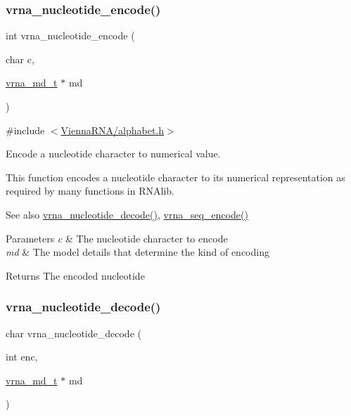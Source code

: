 \subsubsection{\texorpdfstring{vrna\+\_\+nucleotide\+\_\+encode()}{vrna\_nucleotide\_encode()}}
{\footnotesize\ttfamily int vrna\+\_\+nucleotide\+\_\+encode (\begin{DoxyParamCaption}\item[{char}]{c,  }\item[{\hyperlink{group__model__details_ga1f8a10e12a0a1915f2a4eff0b28ea17c}{vrna\+\_\+md\+\_\+t} $\ast$}]{md }\end{DoxyParamCaption})}



{\ttfamily \#include $<$\hyperlink{alphabet_8h}{Vienna\+R\+N\+A/alphabet.\+h}$>$}



Encode a nucleotide character to numerical value. 

This function encodes a nucleotide character to its numerical representation as required by many functions in R\+N\+Alib.

\begin{DoxySeeAlso}{See also}
\hyperlink{group__utils_ga48ef585e697be9c8a08ed68c655e29b6}{vrna\+\_\+nucleotide\+\_\+decode()}, \hyperlink{group__utils_ga636e7d6f888fd639587296a5eddea660}{vrna\+\_\+seq\+\_\+encode()}
\end{DoxySeeAlso}

\begin{DoxyParams}{Parameters}
{\em c} & The nucleotide character to encode \\
\hline
{\em md} & The model details that determine the kind of encoding \\
\hline
\end{DoxyParams}
\begin{DoxyReturn}{Returns}
The encoded nucleotide 
\end{DoxyReturn}
\mbox{\label{group__utils_ga48ef585e697be9c8a08ed68c655e29b6}} 
\subsubsection{\texorpdfstring{vrna\+\_\+nucleotide\+\_\+decode()}{vrna\_nucleotide\_decode()}}
{\footnotesize\ttfamily char vrna\+\_\+nucleotide\+\_\+decode (\begin{DoxyParamCaption}\item[{int}]{enc,  }\item[{\hyperlink{group__model__details_ga1f8a10e12a0a1915f2a4eff0b28ea17c}{vrna\+\_\+md\+\_\+t} $\ast$}]{md }\end{DoxyParamCaption})}



